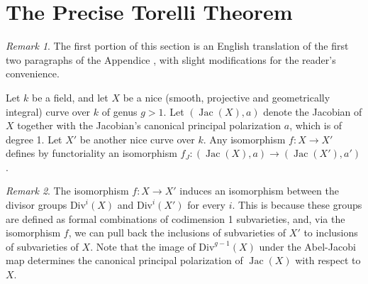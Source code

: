 \documentclass[12pt,reqno]{amsart}
\DeclareMathOperator{\Jac}{Jac}
\newcommand{\R}{\mathbb{R}}
\theoremstyle{definition}
\theoremstyle{remark}
\newtheorem*{remark}{Remark}
\newcommand{\ti}{\todo[inline]}
\begin{document}





\section{The Precise Torelli Theorem}
\label{sec:torelli}


\begin{remark} The first portion of this section is an English translation of the first two paragraphs of the Appendice \cite{Torelli}, with slight modifications for the reader's convenience.\end{remark}

Let $k$ be a field, and let $X$ be a nice (smooth, projective and geometrically integral) curve over $k$ of genus $g > 1$.  Let $(\operatorname{Jac}(X),a)$ denote the Jacobian of $X$ together with the Jacobian's canonical principal polarization $a$, which is of degree 1.  Let $X'$ be another nice curve over $k.$ Any isomorphism $f: X \to X'$ defines by functoriality an isomorphism $f_J: (\Jac(X), a) \to (\Jac(X'), a')$. 

\begin{remark} The isomorphism $f: X \to X'$ induces an isomorphism between the divisor groups $\text{Div}^i(X)$ and $\text{Div}^i(X')$ for every $i$. This is because these groups are defined as formal combinations of codimension 1 subvarieties, and, via the isomorphism $f$, we can pull back the inclusions of subvarieties of $X'$ to inclusions of subvarieties of $X$. Note that the image of $\text{Div}^{g-1}(X)$ under the Abel-Jacobi map determines the canonical principal polarization of $\Jac(X)$ with respect to $X$. \end{remark}
\end{document}
